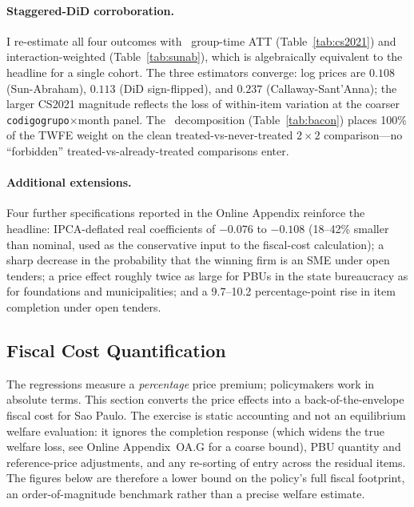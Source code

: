 \paragraph{Staggered-DiD corroboration.}
I re-estimate all four outcomes with~\citet{callaway2021} group-time ATT (Table~\ref{tab:cs2021}) and~\citet{sun2021} interaction-weighted (Table~\ref{tab:sunab}), which is algebraically equivalent to the headline for a single cohort. The three estimators converge: log prices are $0.108$ (Sun-Abraham), $0.113$ (DiD sign-flipped), and $0.237$ (Callaway-Sant'Anna); the larger CS2021 magnitude reflects the loss of within-item variation at the coarser \texttt{codigogrupo}$\times$month panel. The~\citet{goodmanbacon2021} decomposition (Table~\ref{tab:bacon}) places 100\% of the TWFE weight on the clean treated-vs-never-treated $2\times 2$ comparison---no ``forbidden'' treated-vs-already-treated comparisons enter.





\paragraph{Additional extensions.}
Four further specifications reported in the Online Appendix reinforce the headline: IPCA-deflated real coefficients of $-0.076$ to $-0.108$ (18--42\% smaller than nominal, used as the conservative input to the fiscal-cost calculation); a sharp decrease in the probability that the winning firm is an SME under open tenders; a price effect roughly twice as large for PBUs in the state bureaucracy as for foundations and municipalities; and a 9.7--10.2 percentage-point rise in item completion under open tenders.

\subsection{Fiscal Cost Quantification}

The regressions measure a \emph{percentage} price premium; policymakers work in absolute terms. This section converts the price effects into a back-of-the-envelope fiscal cost for Sao Paulo. The exercise is static accounting and not an equilibrium welfare evaluation: it ignores the completion response (which widens the true welfare loss, see Online Appendix~OA.G for a coarse bound), PBU quantity and reference-price adjustments, and any re-sorting of entry across the residual items. The figures below are therefore a lower bound on the policy's full fiscal footprint, an order-of-magnitude benchmark rather than a precise welfare estimate.

